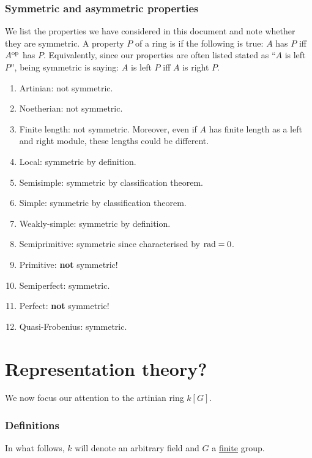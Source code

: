 \documentclass[12pt]{article}
\begin{document}
\section{Symmetric and asymmetric properties}

We list the properties we have considered in this document and note whether they are symmetric. 
A property $P$ of a ring is  if the following is true: $A$ has $P$ iff $A^{\operatorname{op}}$ has $P$. \newline
Equivalently, since our properties are often listed stated as ``$A$ is left $P$'', being symmetric is saying: $A$ is left $P$ iff $A$ is right $P$.

\begin{enumerate}[label=(\alph*)]
	\item Artinian: not symmetric.
	\item Noetherian: not symmetric.
	\item Finite length: not symmetric. \newline
	Moreover, even if $A$ has finite length as a left and right module, these lengths could be different.
	\item Local: symmetric by definition.
	\item Semisimple: symmetric by classification theorem. 
	\item Simple: symmetric by classification theorem. 
	\item Weakly-simple: symmetric by definition.
	\item Semiprimitive: symmetric since characterised by $\operatorname{rad} = 0$.
	\item Primitive: \textbf{not} symmetric! 
	\item Semiperfect: symmetric.
	\item Perfect: \textbf{not} symmetric! 
	\item Quasi-Frobenius: symmetric.
\end{enumerate}

\part{Representation theory?} \label{part:rep-th}

We now focus our attention to the artinian ring $k[G]$.

\section{Definitions}

In what follows, $k$ will denote an arbitrary field and $G$ a \underline{finite} group. 
\end{document}
